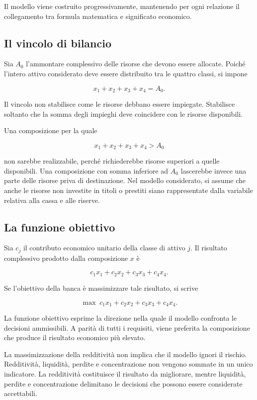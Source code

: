 Il modello viene costruito progressivamente, mantenendo per ogni relazione
il collegamento tra formula matematica e significato economico.

\subsection{Il vincolo di bilancio}

Sia $A_0$ l'ammontare complessivo delle risorse che devono essere allocate.
Poich\'e l'intero attivo considerato deve essere distribuito tra le quattro
classi, si impone

\[
x_1+x_2+x_3+x_4=A_0.
\]

Il vincolo non stabilisce come le risorse debbano essere impiegate. Stabilisce
soltanto che la somma degli impieghi deve coincidere con le risorse
disponibili.

Una composizione per la quale

\[
x_1+x_2+x_3+x_4>A_0
\]

\noindent non sarebbe realizzabile, perch\'e richiederebbe risorse superiori a quelle
disponibili. Una composizione con somma inferiore ad $A_0$ lascerebbe invece
una parte delle risorse priva di destinazione. Nel modello considerato, si
assume che anche le risorse non investite in titoli o prestiti siano
rappresentate dalla variabile relativa alla cassa e alle riserve.

\subsection{La funzione obiettivo}

Sia $c_j$ il contributo economico unitario della classe di attivo $j$. Il
risultato complessivo prodotto dalla composizione $x$ \`e

\[
c_1x_1+c_2x_2+c_3x_3+c_4x_4.
\]

Se l'obiettivo della banca \`e massimizzare tale risultato, si scrive

\[
\max\;
c_1x_1+c_2x_2+c_3x_3+c_4x_4.
\]

La funzione obiettivo esprime la direzione nella quale il modello confronta
le decisioni ammissibili. A parit\`a di tutti i requisiti, viene preferita la
composizione che produce il risultato economico pi\`u elevato.

La massimizzazione della redditivit\`a non implica che il modello ignori il
rischio. Redditivit\`a, liquidit\`a, perdite e concentrazione non vengono sommate in un unico
indicatore. La redditivit\`a costituisce il risultato da migliorare, mentre
liquidit\`a, perdite e concentrazione delimitano le decisioni che possono
essere considerate accettabili.

